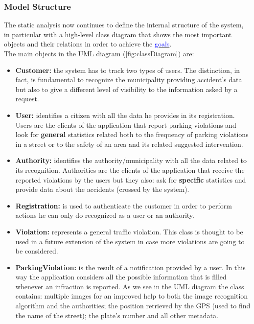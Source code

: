 	\subsubsection{Model Structure}
	The static analysis now continues to define the internal structure of the system, in particular with a high-level class diagram that shows the most important objects and their relations in order to achieve the \hyperref[sec:goals]{\textcolor{blue}{goals}}.\\
	
	The main objects in the UML diagram (\autoref{fig:classDiagram}) are:
	\begin{itemize}
		\item \textbf{Customer:} the system has to track two types of users. The distinction, in fact, is fundamental to recognize the municipality providing accident's data but also to give a different level of visibility to the information asked by a request.
		
		\item \textbf{User:} identifies a citizen with all the data he provides in its registration. Users are the clients of the application that report parking violations and look for \textbf{general} statistics related both to the frequency of parking violations in a street or to the safety of an area and its related suggested intervention.
		
		\item \textbf{Authority:} identifies the authority/municipality with all the data related to its recognition. Authorities are the clients of the application that receive the reported violations by the users but they also: ask for \textbf{specific} statistics and provide data about the accidents (crossed by the system).
		
		\item \textbf{Registration:} is used to authenticate the customer in order to perform actions he can only do recognized as a user or an authority.
		
		\item \textbf{Violation:} represents a general traffic violation. This class is thought to be used in a future extension of the system in case more violations are going to be considered.
		
		\item \textbf{ParkingViolation:} is the result of a notification provided by a user. In this way the application considers all the possible information that is filled whenever an infraction is reported. As we see in the UML diagram the class contains: multiple images for an  improved help to both the image recognition algorithm and the authorities; the position retrieved by the GPS (used to find the name of the street); the plate's number and all other metadata.
		

\end{itemize}
